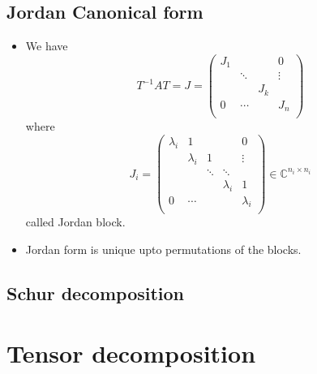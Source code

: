 \documentclass[11pt,reqno]{amsart}
\theoremstyle{remark}
\begin{document}
\subsection{Jordan Canonical form}
\begin{itemize}
\item We have 
\[
T^{-1}AT=J=
\begin{pmatrix}
  J_1 & & & 0 \\
  & \ddots & & \vdots \\
  & & J_k & \\
  0 & \cdots & & J_n \\
\end{pmatrix}
\] where
\[
J_i = 
\begin{pmatrix}
  \lambda_i & 1 & & & 0 \\
  & \lambda_i & 1 & & \vdots \\
  & & \ddots & \ddots & \\
  & & & \lambda_i & 1 \\
  0 & \cdots & & & \lambda_i \\
\end{pmatrix}
\in \mathbb{C}^{n_i\times n_i}
\]
 called Jordan block.
\item Jordan form is unique upto permutations of the blocks.
\end{itemize}
\subsection{Schur decomposition}
\section{Tensor decomposition}
\end{document}
